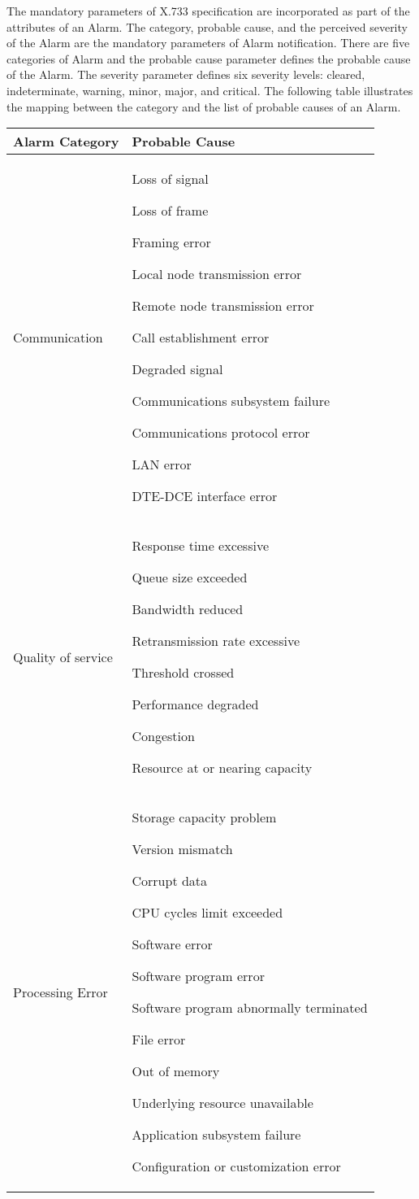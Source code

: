 \begin{flushleft}
The mandatory parameters of X.733 specification are incorporated as part of the attributes of an Alarm. The category, probable cause, and the perceived 
severity of the Alarm are the mandatory parameters of Alarm notification. There are five categories of Alarm and the probable cause parameter defines the 
probable cause of the Alarm. The severity parameter defines six severity levels:  cleared, indeterminate, warning, minor, major, and critical. 
The following table illustrates the mapping between the category and the list of probable causes of an Alarm.
\newpage
\begin{tabular}{|l|p{4in}|}
\hline
 {\bf Alarm Category} & {\bf Probable Cause} \\
\hline
         Communication & Loss of signal
         \par
			Loss of frame
			\par
Framing error
\par
Local node transmission error
\par
Remote node transmission error
\par
Call establishment error
\par
Degraded signal
\par
Communications subsystem failure
\par
Communications protocol error
\par
LAN error
\par
DTE-DCE interface error
 \\
\hline
         Quality of service & Response time excessive
         \par
Queue size exceeded
\par
Bandwidth reduced
\par
Retransmission rate excessive
\par
Threshold crossed
\par
Performance degraded
\par
Congestion
\par
Resource at or nearing capacity
 \\
\hline
Processing Error & Storage capacity problem
\par
Version mismatch
\par
Corrupt data
\par
CPU cycles limit exceeded
\par
Software error
\par
Software program error
\par
Software program abnormally terminated
\par
File error
\par
Out of memory
\par
Underlying resource unavailable
\par
Application subsystem failure
\par
Configuration or customization error
\\
\hline
\end{tabular}  


\end{flushleft}
